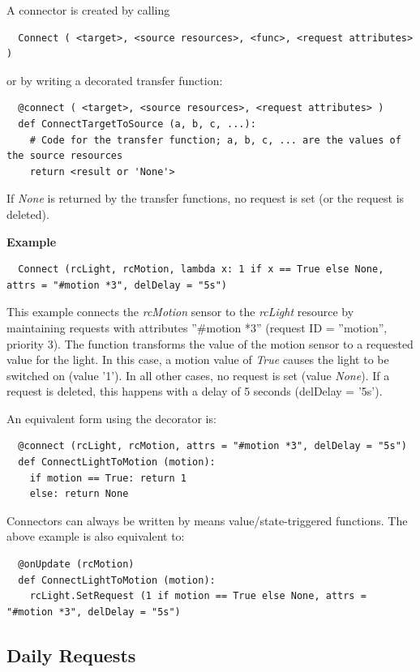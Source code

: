 \documentclass[12pt,english,parskip=half,headheight=19pt]{scrreprt}
\newcommand{\lst}[1]{\colorbox{lstbackground}{\footnotesize\code{#1}}}
\newcommand{\lstf}[1]{\colorbox{lstbackground}{\ttfamily\footnotesize#1}}
\begin{document}
A connector is created by calling
\begin{lstlisting}
  Connect ( <target>, <source resources>, <func>, <request attributes> )
\end{lstlisting}
or by writing a decorated transfer function:
\begin{lstlisting}
  @connect ( <target>, <source resources>, <request attributes> )
  def ConnectTargetToSource (a, b, c, ...):
    # Code for the transfer function; a, b, c, ... are the values of the source resources
    return <result or 'None'>
\end{lstlisting}
If \textit{None} is returned by the transfer functions, no request is set (or the request is deleted).

\textbf{Example}
\begin{lstlisting}
  Connect (rcLight, rcMotion, lambda x: 1 if x == True else None, attrs = "#motion *3", delDelay = "5s")
\end{lstlisting}
This example connects the \textit{rcMotion} sensor to the \textit{rcLight} resource by maintaining requests with attributes \lstf{''\#motion *3''} (request ID = ''motion'', priority 3). The function \lst{lambda x: ...} transforms the value of the motion sensor to a requested value for the light. In this case, a motion value of \textit{True} causes the light to be switched on (value '1'). In all other cases, no request is set (value \textit{None}). If a request is deleted, this happens with a delay of 5 seconds (\lstf{delDelay = '5s'}).

An equivalent form using the decorator is:
\begin{lstlisting}
  @connect (rcLight, rcMotion, attrs = "#motion *3", delDelay = "5s")
  def ConnectLightToMotion (motion):
    if motion == True: return 1
    else: return None
\end{lstlisting}

Connectors can always be written by means value/state-triggered functions. The above example is also equivalent to:
\begin{lstlisting}
  @onUpdate (rcMotion)
  def ConnectLightToMotion (motion):
    rcLight.SetRequest (1 if motion == True else None, attrs = "#motion *3", delDelay = "5s")
\end{lstlisting}



\subsection{Daily Requests}
\label{sec:rules-actions-daily}
\end{document}
